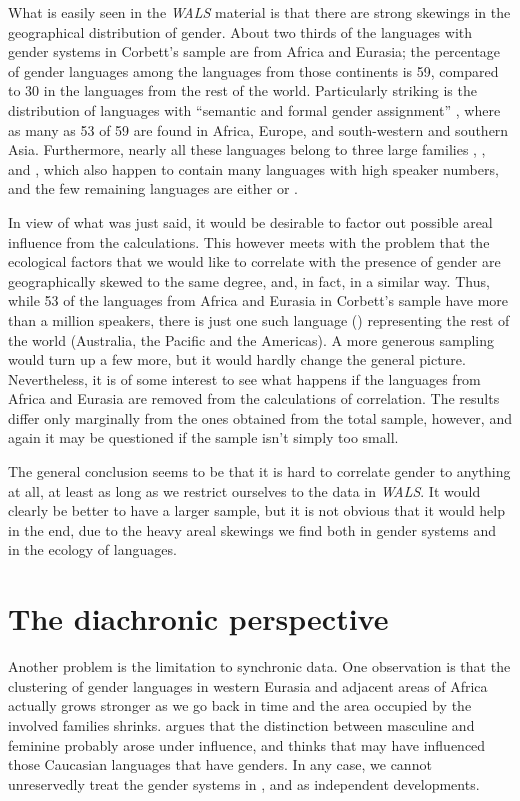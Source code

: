 \documentclass[output=collectionpaper]{langsci/langscibook}
\begin{document}
What is easily seen in the \textit{WALS} material is that there are strong skewings in the geographical distribution of gender. About two thirds of the languages with gender systems in Corbett’s sample are from Africa and Eurasia; the percentage of gender languages among the languages from those continents is 59, compared to 30 in the languages from the rest of the world. Particularly striking is the distribution of languages with ``semantic and formal gender assignment'' \citep{Corbett2013b}, where as many as 53 of 59 are found in Africa, Europe, and south-western and southern Asia. Furthermore, nearly all these languages belong to three large families \textendash{} , , and , which also happen to contain many languages with high speaker numbers, and the few remaining languages are either  or .

In view of what was just said, it would be desirable to factor out possible areal influence from the calculations. This however meets with the problem that the ecological factors that we would like to correlate with the presence of gender are geographically skewed to the same degree, and, in fact, in a similar way. Thus, while 53 of the languages from Africa and Eurasia in Corbett’s sample have more than a million speakers, there is just one such language () representing the rest of the world (Australia, the Pacific and the Americas). A more generous sampling would turn up a few more, but it would hardly change the general picture. Nevertheless, it is of some interest to see what happens if the languages from Africa and Eurasia are removed from the calculations of correlation. The results differ only marginally from the ones obtained from the total sample, however, and again it may be questioned if the sample isn’t simply too small.

The general conclusion seems to be that it is hard to correlate gender to anything at all, at least as long as we restrict ourselves to the data in \textit{WALS}. It would clearly be better to have a larger sample, but it is not obvious that it would help in the end, due to the heavy areal skewings we find both in gender systems and in the ecology of languages.

\section{The diachronic perspective}

Another problem is the limitation to synchronic data. One observation is that the clustering of gender languages in western Eurasia and adjacent areas of Africa actually grows stronger as we go back in time and the area occupied by the involved families shrinks. \citet[252]{Levins2002} argues that the  distinction between masculine and feminine probably arose under  influence, and \citet{Matasovic2012} thinks that  may have influenced those Caucasian languages that have genders. In any case, we cannot unreservedly treat the gender systems in ,  and  as independent developments.
\end{document}
